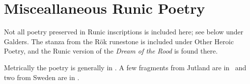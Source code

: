 \part{Misceallaneous Runic Poetry}

Not all poetry preserved in Runic inscriptions is included here; see below under Galders.  The stanza from the Rök runestone is included under Other Heroic Poetry, and the Runic version of the \emph{Dream of the Rood} is found there.

Metrically the poetry is generally in \Fornyrdislag.  A few fragments from Jutland are in \Ljodahattr\ and two from Sweden are in \Drottkvett.





% 





% 


% 


% 
